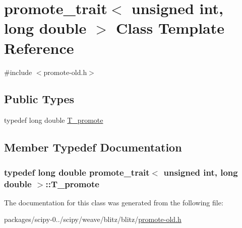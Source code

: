 \hypertarget{classpromote__trait_3_01unsigned_01int_00_01long_01double_01_4}{}\section{promote\+\_\+trait$<$ unsigned int, long double $>$ Class Template Reference}
\label{classpromote__trait_3_01unsigned_01int_00_01long_01double_01_4}


{\ttfamily \#include $<$promote-\/old.\+h$>$}

\subsection*{Public Types}
\begin{DoxyCompactItemize}
\item 
typedef long double \hyperlink{classpromote__trait_3_01unsigned_01int_00_01long_01double_01_4_a717ce5a6a8e1ce9c0987256512b810bd}{T\+\_\+promote}
\end{DoxyCompactItemize}


\subsection{Member Typedef Documentation}
\hypertarget{classpromote__trait_3_01unsigned_01int_00_01long_01double_01_4_a717ce5a6a8e1ce9c0987256512b810bd}{}
\subsubsection[{T\+\_\+promote}]{\setlength{\rightskip}{0pt plus 5cm}typedef long double {\bf promote\+\_\+trait}$<$ unsigned int, long double $>$\+::{\bf T\+\_\+promote}}\label{classpromote__trait_3_01unsigned_01int_00_01long_01double_01_4_a717ce5a6a8e1ce9c0987256512b810bd}


The documentation for this class was generated from the following file\+:\begin{DoxyCompactItemize}
\item 
packages/scipy-\/0../scipy/weave/blitz/blitz/\hyperlink{promote-old_8h}{promote-\/old.\+h}\end{DoxyCompactItemize}
